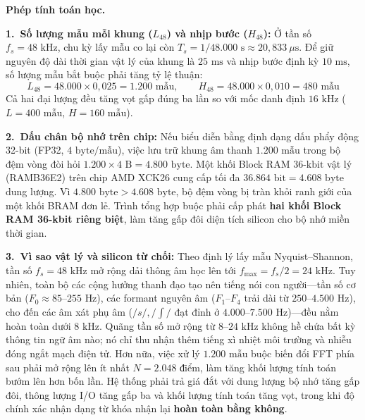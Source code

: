 \documentclass[11pt,a4paper]{article}
\begin{document}
\textbf{Phép tính toán học.}

\textbf{1.~Số lượng mẫu mỗi khung ($L_{48}$) và nhịp bước ($H_{48}$):} Ở tần số $f_s = 48\text{ kHz}$, chu kỳ lấy mẫu co lại còn $T_s = 1 / 48{.}000\text{ s} \approx 20{,}833\ \mu\text{s}$. Để giữ nguyên độ dài thời gian vật lý của khung là $25\text{ ms}$ và nhịp bước định kỳ $10\text{ ms}$, số lượng mẫu bắt buộc phải tăng tỷ lệ thuận:
\begin{equation}
  L_{48} = 48{.}000 \times 0{,}025 = 1{.}200\text{ mẫu}, \qquad H_{48} = 48{.}000 \times 0{,}010 = 480\text{ mẫu}
\end{equation}
Cả hai đại lượng đều tăng vọt gấp đúng ba lần so với mốc danh định $16\text{ kHz}$ ($L = 400\text{ mẫu}$, $H = 160\text{ mẫu}$).

\textbf{2.~Dấu chân bộ nhớ trên chip:} Nếu biểu diễn bằng định dạng dấu phẩy động 32-bit (FP32, $4\text{ byte/mẫu}$), việc lưu trữ khung âm thanh $1{.}200\text{ mẫu}$ trong bộ đệm vòng đòi hỏi $1{.}200 \times 4\text{ B} = 4{.}800\text{ byte}$. Một khối Block RAM $36\text{-kbit}$ vật lý (RAMB36E2) trên chip AMD XCK26 cung cấp tối đa $36{.}864\text{ bit} = 4{.}608\text{ byte}$ dung lượng. Vì $4{.}800\text{ byte} > 4{.}608\text{ byte}$, bộ đệm vòng bị tràn khỏi ranh giới của một khối BRAM đơn lẻ. Trình tổng hợp buộc phải cấp phát \textbf{hai khối Block RAM 36-kbit riêng biệt}, làm tăng gấp đôi diện tích silicon cho bộ nhớ miền thời gian.

\textbf{3.~Vì sao vật lý và silicon từ chối:} Theo định lý lấy mẫu Nyquist--Shannon, tần số $f_s = 48\text{ kHz}$ mở rộng dải thông âm học lên tới $f_{\text{max}} = f_s / 2 = 24\text{ kHz}$. Tuy nhiên, toàn bộ các cộng hưởng thanh đạo tạo nên tiếng nói con người---tần số cơ bản ($F_0 \approx 85\text{--}255\text{ Hz}$), các formant nguyên âm ($F_1\text{--}F_4$ trải dài từ $250\text{--}4{.}500\text{ Hz}$), cho đến các âm xát phụ âm ($/s/, /\int/$ đạt đỉnh ở $4{.}000\text{--}7{.}500\text{ Hz}$)---đều nằm hoàn toàn dưới $8\text{ kHz}$. Quãng tần số mở rộng từ $8\text{--}24\text{ kHz}$ không hề chứa bất kỳ thông tin ngữ âm nào; nó chỉ thu nhận thêm tiếng xì nhiệt môi trường và nhiễu đóng ngắt mạch điện tử. Hơn nữa, việc xử lý $1{.}200\text{ mẫu}$ buộc biến đổi FFT phía sau phải mở rộng lên ít nhất $N = 2{.}048\text{ điểm}$, làm tăng khối lượng tính toán bướm lên hơn bốn lần. Hệ thống phải trả giá đắt với dung lượng bộ nhớ tăng gấp đôi, thông lượng I/O tăng gấp ba và khối lượng tính toán tăng vọt, trong khi độ chính xác nhận dạng từ khóa nhận lại \textbf{hoàn toàn bằng không}.
\end{document}
